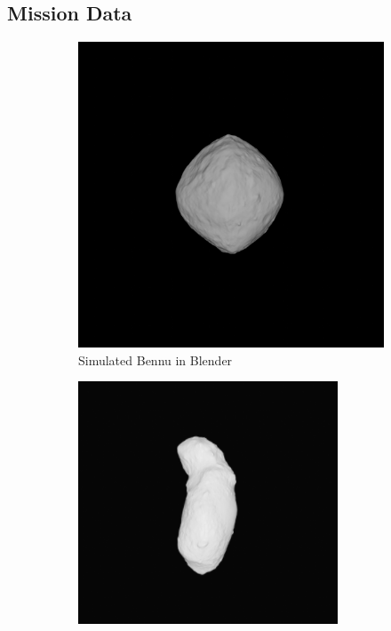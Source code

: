 \subsection{Mission Data}
\begin{figure}
    \centering
    \captionsetup{justification=centering}
     \begin{subfigure}{0.23\textwidth}
         \includegraphics[width =\textwidth, height = \textwidth]{fig/render72.png}
         \caption{Simulated Bennu in Blender}
         \label{fig:y equals x}
     \end{subfigure}
    \hfill
     \begin{subfigure}{0.23\textwidth}
         \centering
         \includegraphics[width = \textwidth, height = \textwidth]{fig/Screen Shot 2021-02-18 at 11.43.43 AM.png}

\end{subfigure}
\end{figure}
